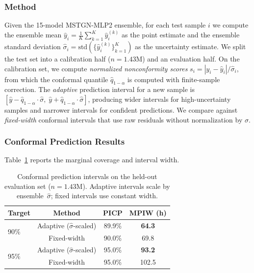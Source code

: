 \documentclass[conference]{IEEEtran}
\begin{document}
\subsubsection{Method}
Given the 15-model MSTGN-MLP2 ensemble, for each test sample $i$ we compute the ensemble mean $\hat{y}_i = \frac{1}{K}\sum_{k=1}^{K}\hat{y}_i^{(k)}$ as the point estimate and the ensemble standard deviation $\hat{\sigma}_i = \text{std}(\{\hat{y}_i^{(k)}\}_{k=1}^{K})$ as the uncertainty estimate.
We split the test set into a calibration half ($n=1.43$M) and an evaluation half.
On the calibration set, we compute \textit{normalized nonconformity scores} $s_i = |y_i - \hat{y}_i| / \hat{\sigma}_i$, from which the conformal quantile $\hat{q}_{1{-}\alpha}$ is computed with finite-sample correction.
The \textit{adaptive} prediction interval for a new sample is $[\hat{y} - \hat{q}_{1{-}\alpha} \cdot \hat{\sigma},\; \hat{y} + \hat{q}_{1{-}\alpha} \cdot \hat{\sigma}]$, producing wider intervals for high-uncertainty samples and narrower intervals for confident predictions.
We compare against \textit{fixed-width} conformal intervals that use raw residuals without normalization by $\hat{\sigma}$.

\subsubsection{Conformal Prediction Results}

Table~\ref{tab:conformal} reports the marginal coverage and interval width.

\begin{table}[t]
    \centering
    \caption{Conformal prediction intervals on the held-out evaluation set ($n=1.43$M). Adaptive intervals scale by ensemble~$\hat{\sigma}$; fixed intervals use constant width.}
    \label{tab:conformal}
    \begin{tabular}{lccc}
        \toprule
        \textbf{Target} & \textbf{Method} & \textbf{PICP} & \textbf{MPIW (h)} \\
        \midrule
        \multirow{2}{*}{90\%} & Adaptive ($\hat{\sigma}$-scaled) & 89.9\% & \textbf{64.3} \\
        & Fixed-width & 90.0\% & 69.8 \\
        \midrule
        \multirow{2}{*}{95\%} & Adaptive ($\hat{\sigma}$-scaled) & 95.0\% & \textbf{93.2} \\
        & Fixed-width & 95.0\% & 102.5 \\
        \bottomrule
    \end{tabular}
\end{table}
\end{document}
